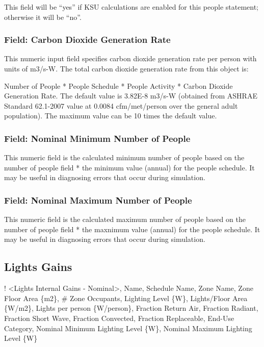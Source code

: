 This field will be ``yes'' if KSU calculations are enabled for this people statement; otherwise it will be ``no''.

\subsubsection{Field: Carbon Dioxide Generation Rate}\label{field-carbon-dioxide-generation-rate}

This numeric input field specifies carbon dioxide generation rate per person with units of m3/s-W. The total carbon dioxide generation rate from this object is:

Number of People * People Schedule * People Activity * Carbon Dioxide Generation Rate. The default value is 3.82E-8 m3/s-W (obtained from ASHRAE Standard 62.1-2007 value at 0.0084 cfm/met/person over the general adult population). The maximum value can be 10 times the default value.

\subsubsection{Field: Nominal Minimum Number of People}\label{field-nominal-minimum-number-of-people}

This numeric field is the calculated minimum number of people based on the number of people field * the minimum value (annual) for the people schedule. It may be useful in diagnosing errors that occur during simulation.

\subsubsection{Field: Nominal Maximum Number of People}\label{field-nominal-maximum-number-of-people}

This numeric field is the calculated maximum number of people based on the number of people field * the maxnimum value (annual) for the people schedule. It may be useful in diagnosing errors that occur during simulation.

\subsection{Lights Gains}\label{lights-gains}

! \textless{}Lights Internal Gains - Nominal\textgreater{}, Name, Schedule Name, Zone Name, Zone Floor Area \{m2\}, \# Zone Occupants, Lighting Level \{W\}, Lights/Floor Area \{W/m2\}, Lights per person \{W/person\}, Fraction Return Air, Fraction Radiant, Fraction Short Wave, Fraction Convected, Fraction Replaceable, End-Use Category, Nominal Minimum Lighting Level \{W\}, Nominal Maximum Lighting Level \{W\}

